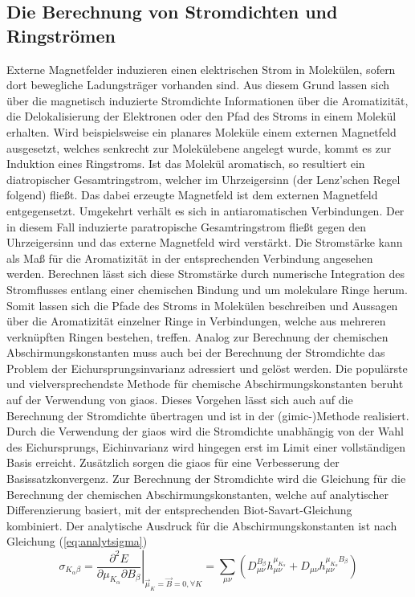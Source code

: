 \subsection{Die Berechnung von Stromdichten und Ringströmen}
Externe Magnetfelder induzieren einen elektrischen Strom in Molekülen, sofern dort bewegliche Ladungsträger vorhanden sind. Aus diesem Grund lassen sich über die magnetisch induzierte Stromdichte Informationen über die Aromatizität, die Delokalisierung der Elektronen oder den Pfad des Stroms in einem Molekül erhalten.\supercite{fliegl2011gauge} Wird beispielsweise ein planares Moleküle einem externen Magnetfeld ausgesetzt, welches senkrecht zur Molekülebene angelegt wurde, kommt es zur Induktion eines Ringstroms. Ist das Molekül aromatisch, so resultiert ein diatropischer Gesamtringstrom, welcher im Uhrzeigersinn (der Lenz'schen Regel folgend) fließt. Das dabei erzeugte Magnetfeld ist dem externen Magnetfeld entgegensetzt. Umgekehrt verhält es sich in antiaromatischen Verbindungen. Der in diesem Fall induzierte paratropische Gesamtringstrom fließt gegen den Uhrzeigersinn und das externe Magnetfeld wird verstärkt. Die Stromstärke kann als Maß für die Aromatizität in der entsprechenden Verbindung angesehen werden. Berechnen lässt sich diese Stromstärke durch numerische Integration des Stromflusses entlang einer chemischen Bindung und um molekulare Ringe herum. Somit lassen sich die Pfade des Stroms in Molekülen beschreiben und Aussagen über die Aromatizität einzelner Ringe in Verbindungen, welche aus mehreren verknüpften Ringen bestehen, treffen. Analog zur Berechnung der chemischen Abschirmungskonstanten muss auch bei der Berechnung der Stromdichte das Problem der Eichursprungsinvarianz adressiert und gelöst werden. Die populärste und vielversprechendste Methode für chemische Abschirmungskonstanten beruht auf der Verwendung von \acp{giao}. Dieses Vorgehen lässt sich auch auf die Berechnung der Stromdichte übertragen und ist in der \mbox{(\acs{gimic}-)}Methode\supercite{juselius2004calculation,taubert2011calculation,fliegl2011gauge,sundholm2016calculations} realisiert. Durch die Verwendung der \acp{giao} wird die Stromdichte unabhängig von der Wahl des Eichursprungs, Eichinvarianz wird hingegen erst im Limit einer vollständigen Basis erreicht.\supercite{juselius2004calculation} Zusätzlich sorgen die \acp{giao} für eine Verbesserung der Basissatzkonvergenz.\supercite{fliegl2011gauge} Zur Berechnung der Stromdichte wird die Gleichung für die Berechnung der chemischen Abschirmungskonstanten, welche auf analytischer Differenzierung basiert, mit der entsprechenden Biot-Savart-Gleichung kombiniert.\supercite{lazzeretti2000ring} Der analytische Ausdruck für die Abschirmungskonstanten ist nach Gleichung (\ref{eq:analytsigma}) 
    \begin{equation}\label{eq:sigmaana}
    \sigma_{K_\alpha\beta}=\left.\frac{\partial^2 E}{\partial \mu_{K_\alpha}\partial B_\beta}\right|_{\vec{\mu}_K=\vec{B}=0,\forall K}=\sum_{\mu\nu}\left(D_{\mu\nu}^{B_\beta}h_{\mu\nu}^{\mu_{K_\alpha}}+D_{\mu\nu}h_{\mu\nu}^{\mu_{K_\alpha}B_\beta}\right) 
    \end{equation}
    
